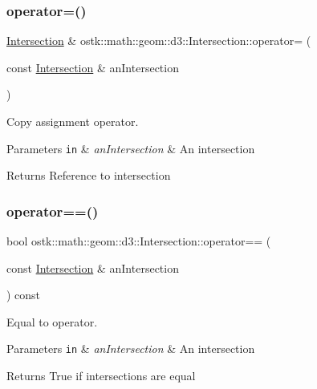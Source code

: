 \subsubsection{\texorpdfstring{operator=()}{operator=()}}
{\footnotesize\ttfamily \hyperlink{classostk_1_1math_1_1geom_1_1d3_1_1_intersection}{Intersection} \& ostk\+::math\+::geom\+::d3\+::\+Intersection\+::operator= (\begin{DoxyParamCaption}\item[{const \hyperlink{classostk_1_1math_1_1geom_1_1d3_1_1_intersection}{Intersection} \&}]{an\+Intersection }\end{DoxyParamCaption})}



Copy assignment operator. 


\begin{DoxyParams}[1]{Parameters}
\mbox{\tt in}  & {\em an\+Intersection} & An intersection \\
\hline
\end{DoxyParams}
\begin{DoxyReturn}{Returns}
Reference to intersection 
\end{DoxyReturn}
\mbox{\label{classostk_1_1math_1_1geom_1_1d3_1_1_intersection_a1cc5592321e85d4cc875e73a4fc64499}} 
\subsubsection{\texorpdfstring{operator==()}{operator==()}}
{\footnotesize\ttfamily bool ostk\+::math\+::geom\+::d3\+::\+Intersection\+::operator== (\begin{DoxyParamCaption}\item[{const \hyperlink{classostk_1_1math_1_1geom_1_1d3_1_1_intersection}{Intersection} \&}]{an\+Intersection }\end{DoxyParamCaption}) const}



Equal to operator. 


\begin{DoxyParams}[1]{Parameters}
\mbox{\tt in}  & {\em an\+Intersection} & An intersection \\
\hline
\end{DoxyParams}
\begin{DoxyReturn}{Returns}
True if intersections are equal 
\end{DoxyReturn}
\mbox{\label{classostk_1_1math_1_1geom_1_1d3_1_1_intersection_afd86dcb53b13578098048dc5c76a9601}} 
